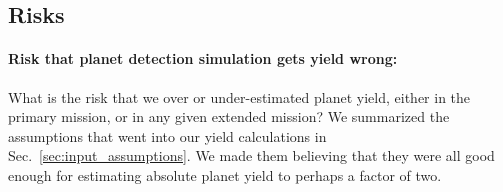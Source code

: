 \subsection{Risks}
\label{sec:risks}

\paragraph{Risk that planet detection simulation gets yield wrong:}
What is the risk that we over or under-estimated \tesss planet yield, either in the primary mission, or in any given extended mission?
We summarized the assumptions that went into our yield calculations in Sec.~\ref{sec:input_assumptions}.
We made them believing that they were all good enough for estimating \tesss absolute planet yield to perhaps a factor of two.

